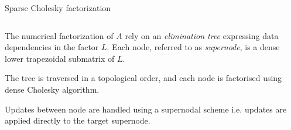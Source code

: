 \documentclass{beamer}
\newcommand{\db}[1]{\textcolor{mblue}{#1\xspace}}
\begin{document}
\begin{frame}{Sparse Cholesky factorization}
  
  \begin{columns}  

    \begin{column}{0.6\textwidth}  

      The numerical factorization of \alert{$A$} rely on an
      \db{\textit{elimination tree}} expressing data dependencies in
      the factor \alert{$L$}. Each node, referred to as
      \db{\textit{supernode}}, is a \alert{dense} lower trapezoidal
      \alert{submatrix} of \alert{$L$}.

      \vspace{0.5cm}

      The tree is traversed in a \db{topological order}, and each node is
      factorised using \alert{dense Cholesky algorithm}.

      \vspace{0.5cm}
      
      Updates between node are handled using a \alert{supernodal scheme}
      i.e. updates are applied directly to the target supernode.

    \end{column}


\end{columns}
\end{frame}
\end{document}

